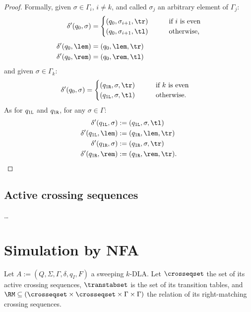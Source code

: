 \begin{proof}
	Formally, given $\sigma\in\Gamma_i$, $i\ne k$, and called $\sigma_j$ an arbitrary element of $\Gamma_j$:
	\begin{align*}
		\delta'(q_0,\sigma) & = \begin{cases}
			                        (q_0,\sigma_{i+1},\tr) \qquad & \text{if $i$ is even}    \\
			                        (q_0,\sigma_{i+1},\tl) \qquad & \text{otherwise} \text,
		                        \end{cases} \\[1ex]
		\delta'(q_0,\lem)   & = (q_0,\lem,\tr)                                          \\
		\delta'(q_0,\rem)   & = (q_0,\rem,\tl)
	\end{align*}
	and given $\sigma\in\Gamma_k$:
	\begin{align*}
		\delta'(q_0,\sigma) & = \begin{cases}
			                        (\qr,\sigma,\tr) \qquad & \text{if $k$ is even}   \\
			                        (\ql,\sigma,\tl) \qquad & \text{otherwise} \text.
		                        \end{cases}
	\end{align*}
	As for $q_{1\mathtt{L}}$ and $q_{1\mathtt{R}}$, for any $\sigma\in\Gamma$:
	\begin{align*}
		\delta'(\ql,\sigma) & :=(\ql,\sigma,\tl) \\
		\delta'(\ql,\lem)   & :=(\qr,\lem,\tr)   \\
		\delta'(\qr,\sigma) & :=(\qr,\sigma,\tr) \\
		\delta'(\qr,\rem)   & :=(\qr,\rem,\tr) \text. \qedhere
	\end{align*}
\end{proof}


\subsection{Active crossing sequences}
\dots


\section{Simulation by NFA}
Let $A:=(Q,\Sigma,\Gamma,\delta,q_I,F)$ a sweeping $k$-DLA.
Let $\crosseqset$ the set of its active crossing sequences, $\transtabset$ is the set of its transition tables, and $\RM\subseteq(\crosseqset\times\crosseqset\times\Gamma\times\Gamma)$ the relation of its right-matching crossing sequences.

